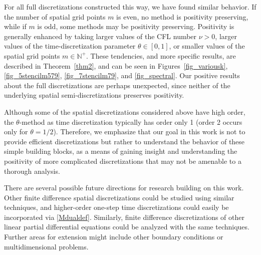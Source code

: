 \documentclass[a4paper]{article}
\begin{document}
For all full discretizations constructed this way, we have found similar behavior.
If the number of spatial grid points $m$ is even, no method is positivity
preserving, while if $m$ is odd, some methods may be positivity
preserving.  Positivity is generally enhanced by taking larger values
of the CFL number $\nu>0$, larger values of the time-discretization parameter $\theta\in [0,1]$, or smaller
values of the spatial grid points $m\in\mathbb{N}^+$.  These tendencies, and more specific results, are described
in Theorem~\ref{thm2}, and can be seen
in Figures~\ref{fig_variousk}, \ref{fig_5stencilm579}, \ref{fig_7stencilm79},
and \ref{fig_spectral}.
Our positive results about the full discretizations are perhaps unexpected, since neither of the underlying spatial semi-discretizations preserves positivity.

Although some of the spatial discretizations considered above have high order, the $\theta$-method as time discretization typically has order only 1 (order 2 occurs only for $\theta=1/2$). Therefore, we emphasize that our goal in this work is not to provide efficient discretizations but rather
to understand the behavior of these simple building blocks, as a means
of gaining insight and understanding the positivity of more complicated
discretizations that may not be amenable to a thorough analysis.


There are several possible future directions for research building on this
work.  Other finite difference spatial discretizations could be studied
using similar techniques, and higher-order one-step time discretizations could
easily be incorporated via \eqref{Mdualdef}.  Similarly, finite difference
discretizations of other linear partial differential equations could be analyzed with the same techniques.
Further areas for extension might 
include other boundary conditions or
multidimensional problems.



\end{document}
